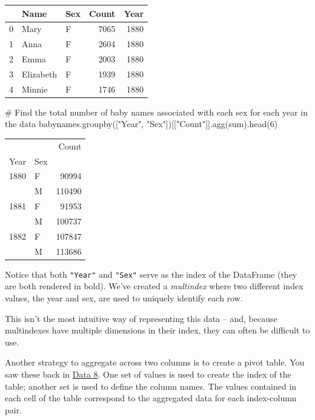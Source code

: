 \documentclass[
  letterpaper,
  DIV=11,
  numbers=noendperiod]{scrreprt}
\newenvironment{Shaded}{\begin{snugshade}}{\end{snugshade}}
\newcommand{\BuiltInTok}[1]{\textcolor[rgb]{0.00,0.23,0.31}{#1}}
\newcommand{\CommentTok}[1]{\textcolor[rgb]{0.37,0.37,0.37}{#1}}
\newcommand{\DecValTok}[1]{\textcolor[rgb]{0.68,0.00,0.00}{#1}}
\newcommand{\NormalTok}[1]{\textcolor[rgb]{0.00,0.23,0.31}{#1}}
\newcommand{\StringTok}[1]{\textcolor[rgb]{0.13,0.47,0.30}{#1}}
\begin{document}
\begin{tabular}{lllrr}
\toprule
{} &       Name & Sex &  Count &  Year \\
\midrule
0 &       Mary &   F &   7065 &  1880 \\
1 &       Anna &   F &   2604 &  1880 \\
2 &       Emma &   F &   2003 &  1880 \\
3 &  Elizabeth &   F &   1939 &  1880 \\
4 &     Minnie &   F &   1746 &  1880 \\
\bottomrule
\end{tabular}

\begin{Shaded}
\begin{Highlighting}[]
\CommentTok{\# Find the total number of baby names associated with each sex for each year in the data}
\NormalTok{babynames.groupby([}\StringTok{"Year"}\NormalTok{, }\StringTok{"Sex"}\NormalTok{])[[}\StringTok{"Count"}\NormalTok{]].agg(}\BuiltInTok{sum}\NormalTok{).head(}\DecValTok{6}\NormalTok{)}
\end{Highlighting}
\end{Shaded}

\begin{tabular}{llr}
\toprule
     &   &   Count \\
Year & Sex &         \\
\midrule
1880 & F &   90994 \\
     & M &  110490 \\
1881 & F &   91953 \\
     & M &  100737 \\
1882 & F &  107847 \\
     & M &  113686 \\
\bottomrule
\end{tabular}

Notice that both \texttt{"Year"} and \texttt{"Sex"} serve as the index
of the DataFrame (they are both rendered in bold). We've created a
\emph{multindex} where two different index values, the year and sex, are
used to uniquely identify each row.

This isn't the most intuitive way of representing this data -- and,
because multindexes have multiple dimensions in their index, they can
often be difficult to use.

Another strategy to aggregate across two columns is to create a pivot
table. You saw these back in
\href{https://inferentialthinking.com/chapters/08/3/Cross-Classifying_by_More_than_One_Variable.html\#pivot-tables-rearranging-the-output-of-group}{Data
8}. One set of values is used to create the index of the table; another
set is used to define the column names. The values contained in each
cell of the table correspond to the aggregated data for each
index-column pair.
\end{document}
